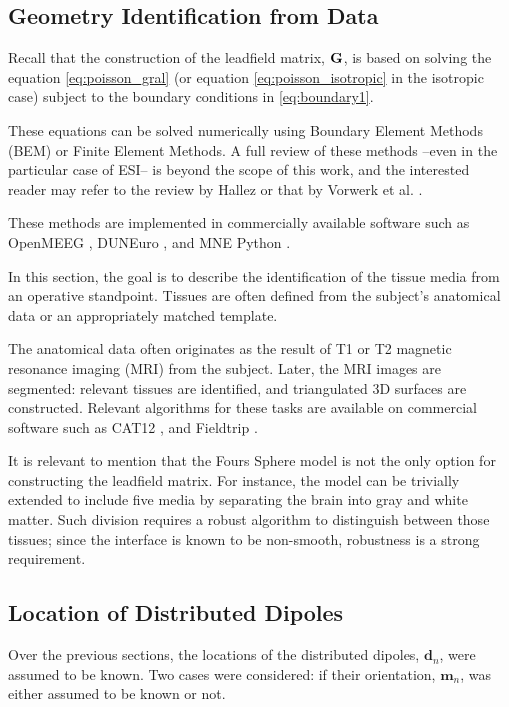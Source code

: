 \subsection{Geometry Identification from Data}

Recall that the construction of the leadfield matrix, $\mathbf{G}$, is based on solving the equation \eqref{eq:poisson_gral} (or equation \eqref{eq:poisson_isotropic} in the isotropic case) 
subject to the boundary conditions in \eqref{eq:boundary1}.

These equations can be solved numerically using Boundary Element Methods (BEM) or Finite Element Methods.
%
A full review of these methods --even in the particular case of ESI-- is beyond the scope of this work, and the interested reader may refer to the review by Hallez \cite{hallez2007review} or that by Vorwerk et al. \cite{vorwerk2012comparison}.

These methods are implemented in commercially available software such as OpenMEEG \cite{gramfort2010openmeeg}, DUNEuro \cite{schrader2021duneuro}, and MNE Python \cite{GramfortEtAl2013a}.

In this section, the goal is to describe the identification of the tissue media from an operative standpoint.
%
Tissues are often defined from the subject's anatomical data or an appropriately matched template.

The anatomical data often originates as the result of T1 or T2 magnetic resonance imaging (MRI) from the subject. 
%
Later, the MRI images are segmented: relevant tissues are identified, and triangulated 3D surfaces are constructed. 
%
Relevant algorithms for these tasks are available on commercial software such as CAT12 \cite{gaser2022cat}, and Fieldtrip \cite{oostenveld2011fieldtrip}.

It is relevant to mention that the Fours Sphere model is not the only option for constructing the leadfield matrix. 
%
For instance, the model can be trivially extended to include five media by separating the brain into gray and white matter.
%
Such division requires a robust algorithm to distinguish between those tissues; since the interface is known to be non-smooth, robustness is a strong requirement.

\subsection{Location of Distributed Dipoles}

Over the previous sections, the locations of the distributed dipoles, $\mathbf{d}_n$, were assumed to be known.
%
Two cases were considered: if their orientation, $\mathbf{m}_n$, was either assumed to be known or not.

